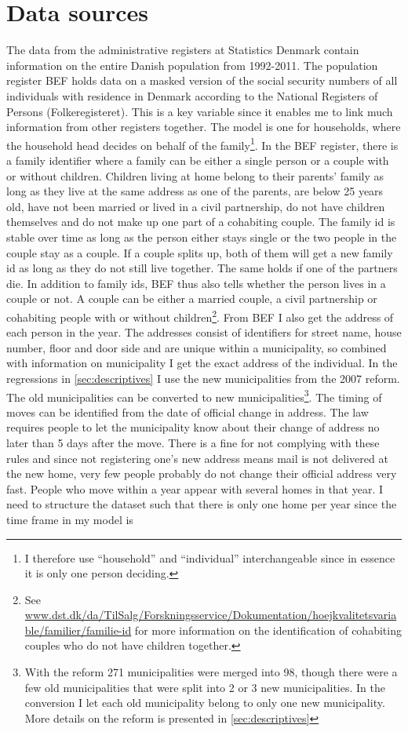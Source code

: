 \section{Data sources}
The data from the administrative registers at Statistics Denmark contain information on the entire Danish population from 1992-2011. The population register BEF holds data on a masked version of the social security numbers of all individuals with residence in Denmark according to the National Registers of Persons (Folkeregisteret). This is a key variable since it enables me to link much information from other registers together. The model is one for households, where the household head decides on behalf of the family\footnote{I therefore use ``household'' and ``individual'' interchangeable since in essence it is only one person deciding.}. In the BEF register, there is a family identifier where a family can be either a single person or a couple with or without children. Children living at home belong to their parents' family as long as they live at the same address as one of the parents, are below 25 years old, have not been married or lived in a civil partnership, do not have children themselves and do not make up one part of a cohabiting couple. The family id is stable over time as long as the person either stays single or the two people in the couple stay as a couple. If a couple splits up, both of them will get a new family id as long as they do not still live together. The same holds if one of the partners die. In addition to family ids, BEF thus also tells whether the person lives in a couple or not. A couple can be either a married couple, a civil partnership or cohabiting people with or without children\footnote{See  \url{www.dst.dk/da/TilSalg/Forskningsservice/Dokumentation/hoejkvalitetsvariable/familier/familie-id} for more information on the identification of cohabiting couples who do not have children together.}. From BEF I also get the address of each person in the year. The addresses consist of identifiers for street name, house number, floor and door side and are unique within a municipality, so combined with information on municipality I get the exact address of the individual. In the regressions in \autoref{sec:descriptives} I use the new municipalities from the 2007 reform. The old municipalities can be converted to new municipalities\footnote{With the reform 271 municipalities were merged into 98, though there were a few old municipalities that were split into 2 or 3 new municipalities. In the conversion I let each old municipality belong to only one new municipality. More details on the reform is presented in \autoref{sec:descriptives}}. The timing of moves can be identified from the date of official change in address. The law requires people to let the municipality know about their change of address no later than 5 days after the move. There is a fine for not complying with these rules and since not registering one's new address means mail is not delivered at the new home, very few people probably do not change their official address very fast. People who move within a year appear with several homes in that year. I need to structure the dataset such that there is only one home per year since the time frame in my model is 
